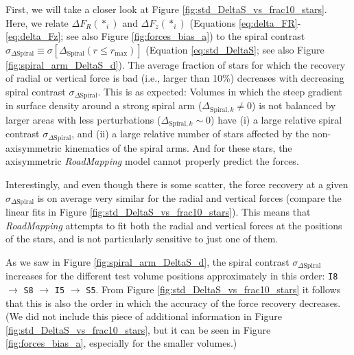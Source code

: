\documentclass[iop,revtex4,numberedappendix,appendixfloats]{emulateapj}
\newcommand{\RM}{{\sl RoadMapping}}
\begin{document}
First, we will take a closer look at Figure \ref{fig:std_DeltaS_vs_frac10_stars}. Here, we relate $\Delta F_R(*_i)$ and $\Delta F_z(*_i)$ (Equations \eqref{eq:delta_FR}-\eqref{eq:delta_Fz}; see also Figure \ref{fig:forces_bias_a}) to the spiral contrast $\sigma_{\Delta\text{Spiral}} \equiv \sigma[\Delta_\text{Spiral}(r \leq r_\text{max})]$ (Equation \eqref{eq:std_DeltaS}; see also Figure \ref{fig:spiral_arm_DeltaS_d}). The average fraction of stars for which the recovery of radial or vertical force is bad (i.e., larger than 10\%) decreases with decreasing spiral contrast $\sigma_{\Delta\text{Spiral}}$. This is as expected: Volumes in which the steep gradient in surface density around a strong spiral arm ($\Delta_{\text{Spiral},k} \neq 0$) is not balanced by larger areas with less perturbations ($\Delta_{\text{Spiral},k} \sim 0$) have (i) a large relative spiral contrast $\sigma_{\Delta\text{Spiral}}$, and (ii) a large relative number of stars affected by the non-axisymmetric kinematics of the spiral arms. And for these stars, the axisymmetric \RM{} model cannot properly predict the forces.

Interestingly, and even though there is some scatter, the force recovery at a given $\sigma_{\Delta\text{Spiral}}$ is on average very similar for the radial and vertical forces (compare the linear fits in Figure \ref{fig:std_DeltaS_vs_frac10_stars}). This means that \RM{} attempts to fit both the radial and vertical forces at the positions of the stars, and is not particularly sensitive to just one of them.

As we saw in Figure \ref{fig:spiral_arm_DeltaS_d}, the spiral contrast $\sigma_{\Delta \text{Spiral}}$ increases for the different test volume positions approximately in this order: \texttt{I8} $\longrightarrow$ \texttt{S8} $\longrightarrow$ \texttt{I5} $\longrightarrow$ \texttt{S5}. From Figure \ref{fig:std_DeltaS_vs_frac10_stars} it follows that this is also the order in which the accuracy of the force recovery decreases. (We did not include this piece of additional information in Figure \ref{fig:std_DeltaS_vs_frac10_stars}, but it can be seen in Figure \ref{fig:forces_bias_a}, especially for the smaller volumes.)
\end{document}
